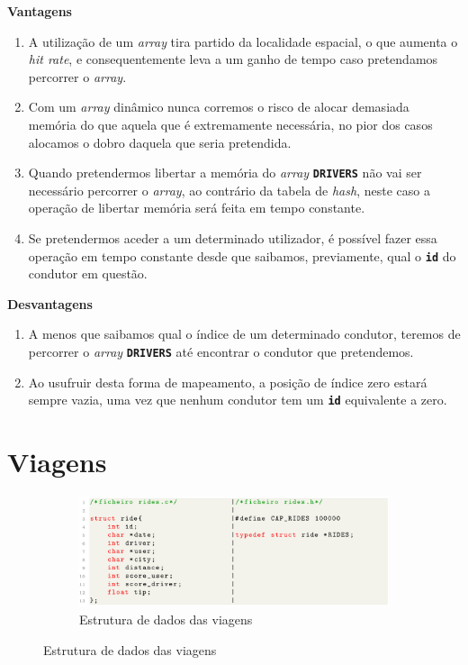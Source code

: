 \documentclass[12pt,a4paper]{report}
\begin{document}
\normalsize\textbf{Vantagens}
    \begin{enumerate}
        \item A utilização de um \textit{array} tira partido da localidade espacial, o que aumenta o \textit{hit rate}, e consequentemente leva a um ganho de tempo caso pretendamos percorrer o \textit{array}.
        
        \item Com um \textit{array} dinâmico nunca corremos o risco de alocar demasiada memória do que aquela que é extremamente necessária, no pior dos casos alocamos o dobro daquela que seria pretendida.
        
        \item Quando pretendermos libertar a memória do \textit{array} \textbf{\small\texttt{DRIVERS}} não vai ser necessário percorrer o \textit{array}, ao contrário da tabela de \textit{hash}, neste caso a operação de libertar memória será feita em tempo constante.
        
        \item Se pretendermos aceder a um determinado utilizador, é possível fazer essa operação em tempo constante desde que saibamos, previamente, qual o \textbf{\small\texttt{id}} do condutor em questão.
    \end{enumerate}

\normalsize\textbf{Desvantagens}
    \begin{enumerate}
        \item A menos que saibamos qual o índice de um determinado condutor, teremos de percorrer o \textit{array} \textbf{\small\texttt{DRIVERS}} até encontrar o condutor que pretendemos.

        \item Ao usufruir desta forma de mapeamento, a posição de índice zero estará sempre vazia, uma vez que nenhum condutor tem um \textbf{\small\texttt{id}} equivalente a zero.
    \end{enumerate}

\pagebreak
\section{Viagens}

\begin{figure}[hbt!]
    \centering
    \begin{subfigure}{\textwidth}
        \centering
        \includegraphics[width=1\linewidth]{images/rides.png}
        \caption*{Estrutura de dados das viagens}
        \label{fig:rides}
    \end{subfigure}
\end{figure}
\end{document}
